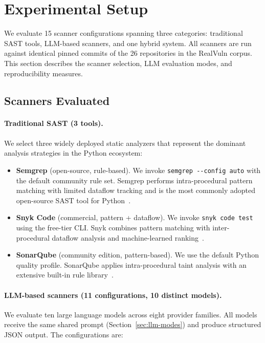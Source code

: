 \section{Experimental Setup}
\label{sec:experimental-setup}

We evaluate 15 scanner configurations spanning three categories:
traditional SAST tools, LLM-based scanners, and one hybrid system.
All scanners are run against identical pinned commits of the 26
repositories in the RealVuln corpus. This section describes the scanner
selection, LLM evaluation modes, and reproducibility measures.

\subsection{Scanners Evaluated}
\label{sec:scanners}

\paragraph{Traditional SAST (3 tools).}
We select three widely deployed static analyzers that represent the
dominant analysis strategies in the Python ecosystem:

\begin{itemize}
  \item \textbf{Semgrep} (open-source, rule-based). We invoke
    \texttt{semgrep -{}-config auto} with the default community rule set.
    Semgrep performs intra-procedural pattern matching with limited
    dataflow tracking and is the most commonly adopted open-source SAST
    tool for Python~\cite{semgrep}.
  \item \textbf{Snyk Code} (commercial, pattern + dataflow). We invoke
    \texttt{snyk code test} using the free-tier CLI. Snyk combines
    pattern matching with inter-procedural dataflow analysis and
    machine-learned ranking~\cite{snyk}.
  \item \textbf{SonarQube} (community edition, pattern-based). We use
    the default Python quality profile. SonarQube applies
    intra-procedural taint analysis with an extensive built-in rule
    library~\cite{sonarqube}.
\end{itemize}

\paragraph{LLM-based scanners (11 configurations, 10 distinct models).}
We evaluate ten large language models across eight provider families.
All models receive the same shared prompt (Section~\ref{sec:llm-modes})
and produce structured JSON output. The configurations are:


